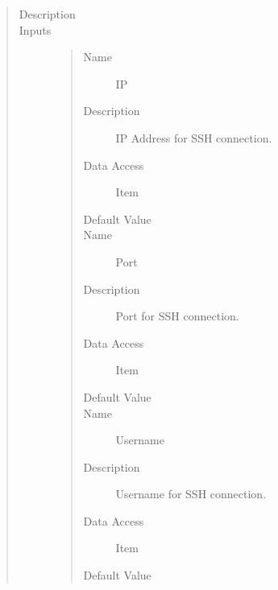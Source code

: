 \documentclass[letterpaper,10pt,english]{sphinxmanual}
\begin{document}
\begin{quote}\begin{description}
\item[{Description}] \leavevmode
{}

\item[{Inputs}] \leavevmode\begin{quote}\begin{description}
\item[{Name}] \leavevmode
IP

\item[{Description}] \leavevmode
IP Address for SSH connection.

\item[{Data Access}] \leavevmode
Item

\item[{Default Value}] \leavevmode
{}

\item[{Name}] \leavevmode
Port

\item[{Description}] \leavevmode
Port for SSH connection.

\item[{Data Access}] \leavevmode
Item

\item[{Default Value}] \leavevmode
{}

\item[{Name}] \leavevmode
Username

\item[{Description}] \leavevmode
Username for SSH connection.

\item[{Data Access}] \leavevmode
Item

\item[{Default Value}] \leavevmode
{}


\end{description}
\end{quote}
\end{description}
\end{quote}
\end{document}
